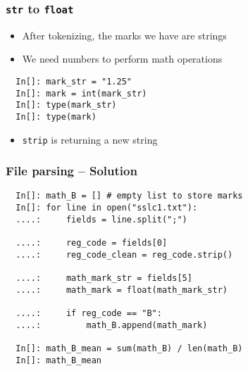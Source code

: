\begin{frame}[fragile]
  \frametitle{\texttt{str} to \texttt{float}}
  \begin{itemize}
  \item After tokenizing, the marks we have are strings
  \item We need numbers to perform math operations
  \end{itemize}
  \begin{lstlisting}
  In[]: mark_str = "1.25"
  In[]: mark = int(mark_str)
  In[]: type(mark_str)
  In[]: type(mark)
  \end{lstlisting}
  \begin{itemize}
  \item \texttt{strip} is returning a new string 
  \end{itemize}
\end{frame}

\begin{frame}[fragile]
  \frametitle{File parsing -- Solution}
  \begin{lstlisting}
  In[]: math_B = [] # empty list to store marks
  In[]: for line in open("sslc1.txt"):
  ....:     fields = line.split(";")

  ....:     reg_code = fields[0]
  ....:     reg_code_clean = reg_code.strip()

  ....:     math_mark_str = fields[5]
  ....:     math_mark = float(math_mark_str)

  ....:     if reg_code == "B":
  ....:         math_B.append(math_mark)

  In[]: math_B_mean = sum(math_B) / len(math_B)
  In[]: math_B_mean
  \end{lstlisting}
\end{frame}
